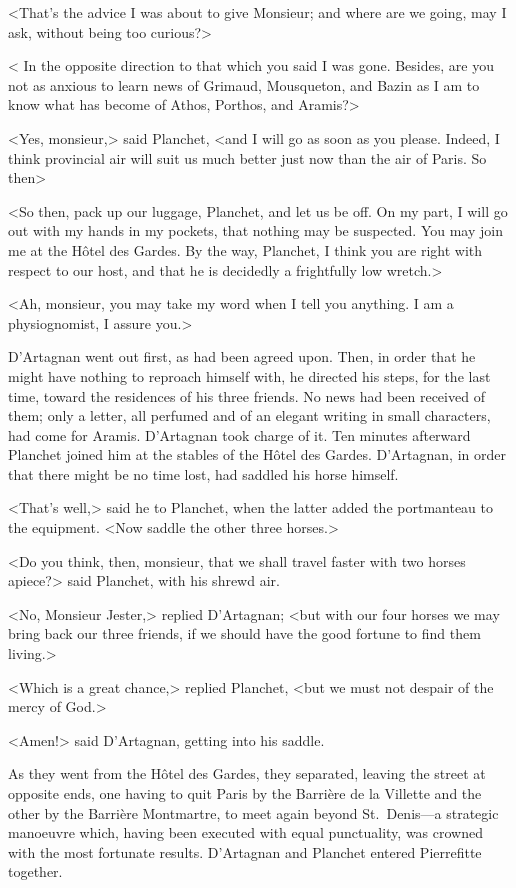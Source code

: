 <That's the advice I was about to give Monsieur; and where are we going, may I ask, without being too curious?> 

< In the opposite direction to that which you said I was gone. Besides, are you not as anxious to learn news of Grimaud, Mousqueton, and Bazin as I am to know what has become of Athos, Porthos, and Aramis?> 

<Yes, monsieur,> said Planchet, <and I will go as soon as you please. Indeed, I think provincial air will suit us much better just now than the air of Paris. So then\longdash> 

<So then, pack up our luggage, Planchet, and let us be off. On my part, I will go out with my hands in my pockets, that nothing may be suspected. You may join me at the Hôtel des Gardes. By the way, Planchet, I think you are right with respect to our host, and that he is decidedly a frightfully low wretch.> 

<Ah, monsieur, you may take my word when I tell you anything. I am a physiognomist, I assure you.> 

D'Artagnan went out first, as had been agreed upon. Then, in order that he might have nothing to reproach himself with, he directed his steps, for the last time, toward the residences of his three friends. No news had been received of them; only a letter, all perfumed and of an elegant writing in small characters, had come for Aramis. D'Artagnan took charge of it. Ten minutes afterward Planchet joined him at the stables of the Hôtel des Gardes. D'Artagnan, in order that there might be no time lost, had saddled his horse himself. 

<That's well,> said he to Planchet, when the latter added the portmanteau to the equipment. <Now saddle the other three horses.> 

<Do you think, then, monsieur, that we shall travel faster with two horses apiece?> said Planchet, with his shrewd air. 

<No, Monsieur Jester,> replied D'Artagnan; <but with our four horses we may bring back our three friends, if we should have the good fortune to find them living.> 

<Which is a great chance,> replied Planchet, <but we must not despair of the mercy of God.> 

<Amen!> said D'Artagnan, getting into his saddle. 

As they went from the Hôtel des Gardes, they separated, leaving the street at opposite ends, one having to quit Paris by the Barrière de la Villette and the other by the Barrière Montmartre, to meet again beyond St.~Denis—a strategic manoeuvre which, having been executed with equal punctuality, was crowned with the most fortunate results. D'Artagnan and Planchet entered Pierrefitte together. 


